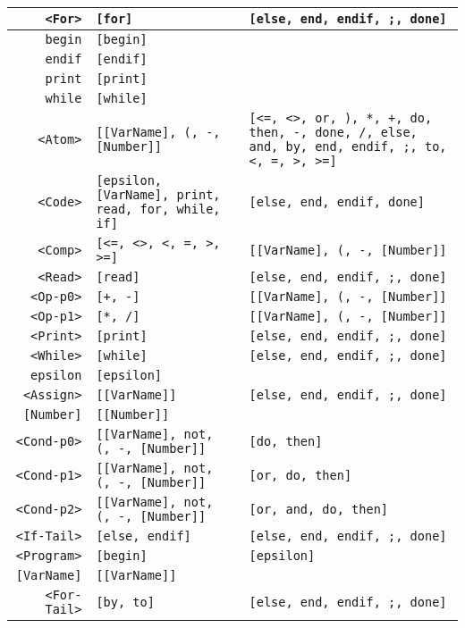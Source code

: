 \begin{longtable}{r|l|l}
\verb#<For># & \verb#[for]# & \verb#[else, end, endif, ;, done]# \\ \hline
\verb#begin# & \verb#[begin]# & \verb## \\ \hline
\verb#endif# & \verb#[endif]# & \verb## \\ \hline
\verb#print# & \verb#[print]# & \verb## \\ \hline
\verb#while# & \verb#[while]# & \verb## \\ \hline
\verb#<Atom># & \verb#[[VarName], (, -, [Number]]# & \verb#[<=, <>, or, ), *, +, do, then, -, done, /, else, and, by, end, endif, ;, to, <, =, >, >=]# \\ \hline
\verb#<Code># & \verb#[epsilon, [VarName], print, read, for, while, if]# & \verb#[else, end, endif, done]# \\ \hline
\verb#<Comp># & \verb#[<=, <>, <, =, >, >=]# & \verb#[[VarName], (, -, [Number]]# \\ \hline
\verb#<Read># & \verb#[read]# & \verb#[else, end, endif, ;, done]# \\ \hline
\verb#<Op-p0># & \verb#[+, -]# & \verb#[[VarName], (, -, [Number]]# \\ \hline
\verb#<Op-p1># & \verb#[*, /]# & \verb#[[VarName], (, -, [Number]]# \\ \hline
\verb#<Print># & \verb#[print]# & \verb#[else, end, endif, ;, done]# \\ \hline
\verb#<While># & \verb#[while]# & \verb#[else, end, endif, ;, done]# \\ \hline
\verb#epsilon# & \verb#[epsilon]# & \verb## \\ \hline
\verb#<Assign># & \verb#[[VarName]]# & \verb#[else, end, endif, ;, done]# \\ \hline
\verb#[Number]# & \verb#[[Number]]# & \verb## \\ \hline
\verb#<Cond-p0># & \verb#[[VarName], not, (, -, [Number]]# & \verb#[do, then]# \\ \hline
\verb#<Cond-p1># & \verb#[[VarName], not, (, -, [Number]]# & \verb#[or, do, then]# \\ \hline
\verb#<Cond-p2># & \verb#[[VarName], not, (, -, [Number]]# & \verb#[or, and, do, then]# \\ \hline
\verb#<If-Tail># & \verb#[else, endif]# & \verb#[else, end, endif, ;, done]# \\ \hline
\verb#<Program># & \verb#[begin]# & \verb#[epsilon]# \\ \hline
\verb#[VarName]# & \verb#[[VarName]]# & \verb## \\ \hline
\verb#<For-Tail># & \verb#[by, to]# & \verb#[else, end, endif, ;, done]# \\ \hline

\end{longtable}
